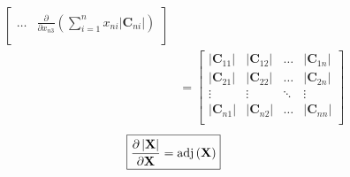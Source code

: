 \documentclass{article}
\newcommand{\adj}[1]{\ensuremath{\textnormal{adj}\left(#1\right)}} %
\newcommand\abs[1]{\left\lvert#1\right\rvert}
\begin{document}
\begin{align}
\begin{bmatrix}
        \dots & 
        \displaystyle \frac{\partial}{\partial x_{n3}} \left( \sum_{i = 1}^{n} x_{ni} \abs{\mathbf{C}_{ni}} \right) \\
    \end{bmatrix} \\
    &= \begin{bmatrix}
        \abs{\mathbf{C}_{11}} & \abs{\mathbf{C}_{12}} & \dots & \abs{\mathbf{C}_{1n}} \\
        \abs{\mathbf{C}_{21}} & \abs{\mathbf{C}_{22}} & \dots & \abs{\mathbf{C}_{2n}} \\
        \vdots & \vdots & \ddots & \vdots \\
        \abs{\mathbf{C}_{n1}} & \abs{\mathbf{C}_{n2}} & \dots & \abs{\mathbf{C}_{nn}} \\
    \end{bmatrix}
\end{align}
\begin{align}
    \boxed{\frac{\partial \abs{\mathbf{X}}}{\partial \mathbf{X}} = \adj{\mathbf{X}}}
\end{align}

\nocite{*}
\printbibliography
\end{document}
